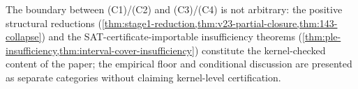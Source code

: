 The boundary between (C1)/(C2) and (C3)/(C4) is not arbitrary: the
positive structural reductions
(\cref{thm:stage1-reduction,thm:v23-partial-closure,thm:143-collapse})
and the SAT-certificate-importable insufficiency theorems
(\cref{thm:ple-insufficiency,thm:interval-cover-insufficiency})
constitute the kernel-checked content of the paper; the empirical
floor and conditional discussion are presented as separate
categories without claiming kernel-level certification.

